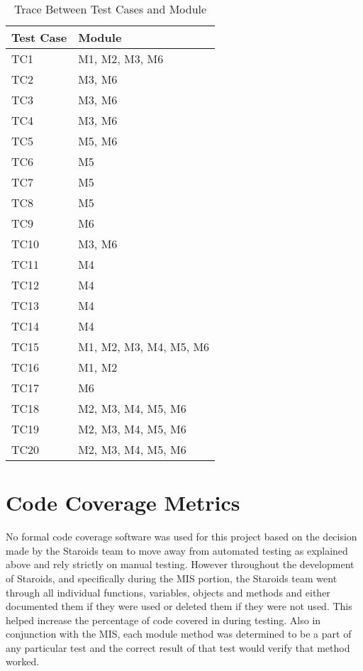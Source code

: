 \documentclass[12pt, titlepage]{article}
\begin{document}
\begin{table}[H]
\centering
\begin{tabular}{p{} p{}}
\toprule
\textbf{Test Case} & \textbf{Module}\\
\midrule
TC1  & M1, M2, M3, M6\\
TC2  & M3, M6\\
TC3  & M3, M6\\
TC4  & M3, M6\\
TC5  & M5, M6\\
TC6  & M5\\
TC7  & M5\\
TC8  & M5\\
TC9  & M6\\
TC10 & M3, M6\\
TC11 & M4\\
TC12 & M4\\
TC13 & M4\\
TC14 & M4\\
TC15 & M1, M2, M3, M4, M5, M6\\
TC16 & M1, M2\\
TC17 & M6\\
TC18 & M2, M3, M4, M5, M6\\
TC19 & M2, M3, M4, M5, M6\\
TC20 & M2, M3, M4, M5, M6\\

\bottomrule
\end{tabular}
\caption{Trace Between Test Cases and Module}
\end{table}

\section{Code Coverage Metrics}
No formal code coverage software was used for this project based on the decision made by the Staroids team to move away from automated testing as explained above and rely strictly on manual testing. However throughout the development of Staroids, and specifically during the MIS portion, the Staroids team went through all individual functions, variables, objects and methods and either documented them if they were used or deleted them if they were not used. This helped increase the percentage of code covered in during testing. Also in conjunction with the MIS, each module method was determined to be a part of any particular test and the correct result of that test would verify that method worked.




\end{document}
